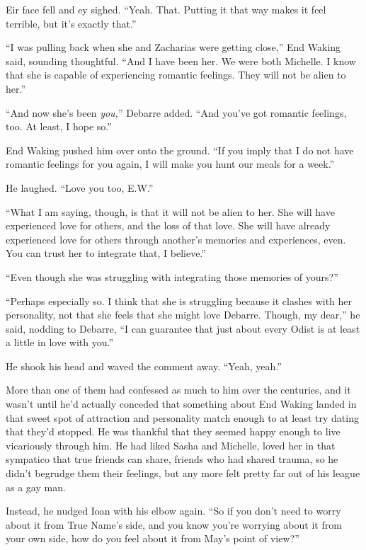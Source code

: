 Eir face fell and ey sighed. ``Yeah. That. Putting it that way makes it feel terrible, but it's exactly that.''

``I was pulling back when she and Zacharias were getting close,'' End Waking said, sounding thoughtful. ``And I have been her. We were both Michelle. I know that she is capable of experiencing romantic feelings. They will not be alien to her.''

``And now she's been \emph{you,}'' Debarre added. ``And you've got romantic feelings, too. At least, I hope so.''

End Waking pushed him over onto the ground. ``If you imply that I do not have romantic feelings for you again, I will make you hunt our meals for a week.''

He laughed. ``Love you too, E.W.''

``What I am saying, though, is that it will not be alien to her. She will have experienced love for others, and the loss of that love. She will have already experienced love for others through another's memories and experiences, even. You can trust her to integrate that, I believe.''

``Even though she was struggling with integrating those memories of yours?''

``Perhaps especially so. I think that she is struggling because it clashes with her personality, not that she feels that she might love Debarre. Though, my dear,'' he said, nodding to Debarre, ``I can guarantee that just about every Odist is at least a little in love with you.''

He shook his head and waved the comment away. ``Yeah, yeah.''

More than one of them had confessed as much to him over the centuries, and it wasn't until he'd actually conceded that something about End Waking landed in that sweet spot of attraction and personality match enough to at least try dating that they'd stopped. He was thankful that they seemed happy enough to live vicariously through him. He had liked Sasha and Michelle, loved her in that sympatico that true friends can share, friends who had shared trauma, so he didn't begrudge them their feelings, but any more felt pretty far out of his league as a gay man.

Instead, he nudged Ioan with his elbow again. ``So if you don't need to worry about it from True Name's side, and you know you're worrying about it from your own side, how do you feel about it from May's point of view?''

